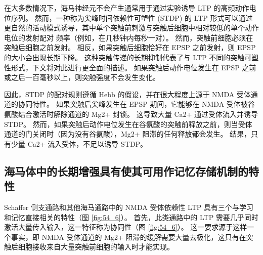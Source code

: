 在大多数情况下，海马神经元不会产生通常用于通过实验诱导 LTP 的高频动作电位序列。
然而，一种称为尖峰时间依赖性可塑性 (STDP) 的 LTP 形式可以通过更自然的活动模式诱导，其中单个突触前刺激与突触后细胞中相对较低的单个动作电位的发射配对 频率（例如，在几秒钟内每秒一对）。
然而，突触前细胞必须在突触后细胞之前发射。 相反，如果突触后细胞恰好在 EPSP 之前发射，则 EPSP 的大小会出现长期下降。
这种突触传递的长期抑制代表了与 LTP 不同的突触可塑性形式，下文将对此进行更全面的描述。
如果突触后动作电位发生在 EPSP 之前或之后一百毫秒以上，则突触强度不会发生变化。


因此，STDP 的配对规则遵循 Hebb 的假设，并在很大程度上源于 NMDA 受体通道的协同特性。
如果突触后尖峰发生在 EPSP 期间，它能够在 NMDA 受体被谷氨酸结合激活时解除通道的 Mg2+ 封锁。
这导致大量 Ca2+ 通过受体流入并诱导 STDP。
然而，如果突触后动作电位发生在谷氨酸的突触前释放之前，则当受体通道的门关闭时（因为没有谷氨酸），Mg2+ 阻滞的任何释放都会发生。
结果，只有少量 Ca2+ 流入受体，不足以诱导 STDP。



\subsection{海马体中的长期增强具有使其可用作记忆存储机制的特性}

Schaffer 侧支通路和其他海马通路中的 NMDA 受体依赖性 LTP 具有三个与学习和记忆直接相关的特性（图 \ref{fig:54_6}）。
首先，此类通路中的 LTP 需要几乎同时激活大量传入输入，这一特征称为协同性（图 \ref{fig:54_6}）。
这一要求源于这样一个事实，即 NMDA 受体通道的 Mg2+ 阻滞的缓解需要大量去极化，这只有在突触后细胞接收来自大量突触前细胞的输入时才能实现。



